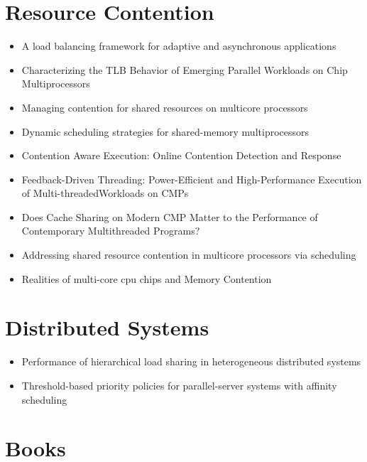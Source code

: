 \section*{Resource Contention}
\label{sec:lr-resource-contention}

\begin{itemize}
\item A load balancing framework for adaptive and asynchronous
  applications \cite{Barker2004}
\item Characterizing the TLB Behavior of Emerging Parallel Workloads
  on Chip Multiprocessors \cite{Bhattacharjee2009}
\item Managing contention for shared resources on multicore processors
  \cite{Fedorova2010}
\item Dynamic scheduling strategies for shared-memory multiprocessors
  \cite{Hamidzadeh1996}
\item Contention Aware Execution: Online Contention Detection and
  Response \cite{Soffa2010}
\item Feedback-Driven Threading: Power-Efficient and High-Performance
  Execution of Multi-threadedWorkloads on CMPs \cite{Suleman2008}
\item Does Cache Sharing on Modern CMP Matter to the Performance of
  Contemporary Multithreaded Programs? \cite{Zhang2010}
\item Addressing shared resource contention in multicore processors
  via scheduling \cite{Zhuravlev2010}
\item Realities of multi-core cpu chips and Memory Contention
  \cite{Barker2009}
\end{itemize}


\section*{Distributed Systems}
\label{sec:lr-distributed-systems}

\begin{itemize}
\item Performance of hierarchical load sharing in heterogeneous
  distributed systems \cite{Lo1996}
\item Threshold-based priority policies for parallel-server systems
  with affinity scheduling \cite{Squillante2001}
\end{itemize}


\section*{Books}
\label{sec:lr-books}

